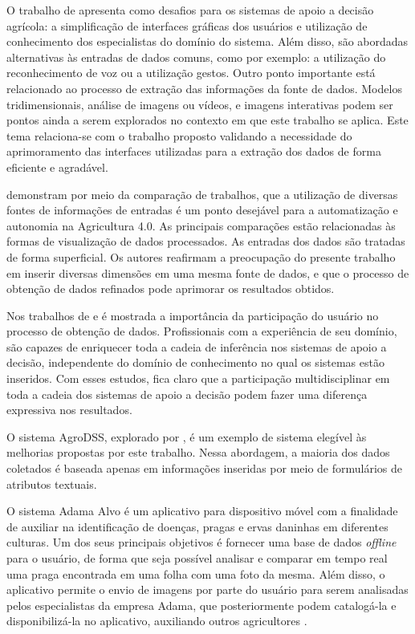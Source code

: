 \documentclass[12pt]{article}
\begin{document}
O trabalho de  apresenta como desafios para os sistemas de apoio a decisão agrícola: a simplificação de interfaces gráficas dos usuários e utilização de conhecimento dos especialistas do domínio do sistema. Além disso, são abordadas alternativas às entradas de dados comuns, como por exemplo: a utilização do reconhecimento de voz ou a utilização gestos. Outro ponto importante está relacionado ao processo de extração das informações da fonte de dados. Modelos tridimensionais, análise de imagens ou vídeos, e imagens interativas podem ser pontos ainda a serem explorados no contexto em que este trabalho se aplica. Este tema relaciona-se com o trabalho proposto validando a necessidade do aprimoramento das interfaces utilizadas para a extração dos dados de forma eficiente e agradável.

 demonstram por meio da comparação de trabalhos, que a utilização de diversas fontes de informações de entradas é um ponto desejável para a automatização e autonomia na Agricultura 4.0. As principais comparações estão relacionadas às formas de visualização de dados processados. As entradas dos dados são tratadas de forma superficial. Os autores reafirmam a preocupação do presente trabalho em inserir diversas dimensões em uma mesma fonte de dados, e que o processo de obtenção de dados refinados pode aprimorar os resultados obtidos.

Nos trabalhos de  e  é mostrada a importância da participação do usuário no processo de obtenção de dados. Profissionais com a experiência de seu domínio, são capazes de enriquecer toda a cadeia de inferência nos sistemas de apoio a decisão, independente do domínio de conhecimento no qual os sistemas estão inseridos. Com esses estudos, fica claro que a participação multidisciplinar em toda a cadeia dos sistemas de apoio a decisão podem fazer uma diferença expressiva nos resultados.

O sistema AgroDSS, explorado por , é um exemplo de sistema elegível às melhorias propostas por este trabalho. Nessa abordagem, a maioria dos dados coletados é baseada apenas em informações inseridas por meio de formulários de atributos textuais.

O sistema Adama Alvo é um aplicativo para dispositivo móvel com a finalidade de auxiliar na identificação de doenças, pragas e ervas daninhas em diferentes culturas. Um dos seus principais objetivos é fornecer uma base de dados \textit{offline} para o usuário, de forma que seja possível analisar e comparar em tempo real uma praga encontrada em uma folha com uma foto da mesma. Além disso, o aplicativo permite o envio de imagens por parte do usuário para serem analisadas pelos especialistas da empresa Adama, que posteriormente podem catalogá-la e disponibilizá-la no aplicativo, auxiliando outros agricultores \cite{AdamaAlvo:2020}.
\end{document}
